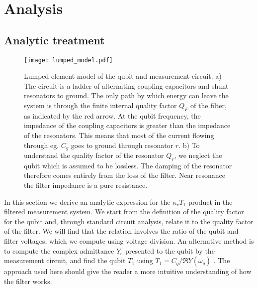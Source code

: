\section{Analysis}

\subsection{Analytic treatment}

\begin{figure*}
\begin{centering}
\texttt{[image: lumped\_model.pdf]}
\par\end{centering}
\caption{Lumped element model of the qubit and measurement circuit. a) The circuit is a ladder of alternating coupling capacitors and shunt resonators to ground. The only path by which energy can leave the system is through the finite internal quality factor $Q_F$ of the filter, as indicated by the red arrow. At the qubit frequency, the impedance of the coupling capacitors is greater than the impedance of the resonators. This means that most of the current flowing through eg. $C_g$ goes to ground through resonator $r$. b) To understand the quality factor of the resonator $Q_r$, we neglect the qubit which is assumed to be lossless. The damping of the resonator therefore comes entirely from the loss of the filter. Near resonance the filter impedance is a pure resistance.}
\label{Fig:lumpedModel}
\end{figure*}

In this section we derive an analytic expression for the $\kappa_r T_1$ product in the filtered measurement system.
We start from the definition of the quality factor for the qubit and, through standard circuit analysis, relate it to the quality factor of the filter.
We will find that the relation involves the ratio of the qubit and filter voltages, which we compute using voltage division.
An alternative method is to compute the complex admittance $Y_e$ presented to the qubit by the measurement circuit, and find the qubit $T_1$ using $T_1 = C_q / \Re Y(\omega_q)$ \cite{Esteve:dissipation1986}.
The approach used here should give the reader a more intuitive understanding of how the filter works.

